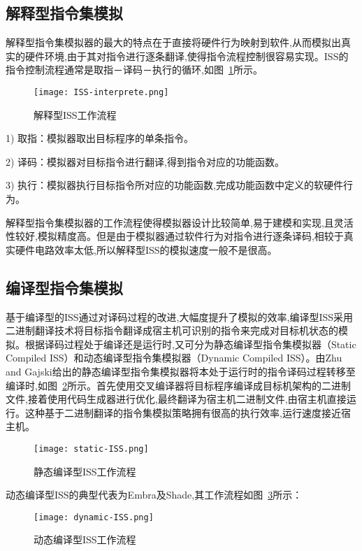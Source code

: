\subsection{解释型指令集模拟}
解释型指令集模拟器的最大的特点在于直接将硬件行为映射到软件,从而模拟出真实的硬件环境,由于其对指令进行逐条翻译,使得指令流程控制很容易实现\cite{jump,蔡启先2010mips64}。ISS的指令控制流程通常是取指－译码－执行的循环,如图~\ref{fig:ISS-interprete}所示。
\begin{figure}[h]
  \centering
  \texttt{[image: ISS-interprete.png]}
  \caption{解释型ISS工作流程}
  \label{fig:ISS-interprete}
\end{figure}


1) 取指：模拟器取出目标程序的单条指令。


2) 译码：模拟器对目标指令进行翻译,得到指令对应的功能函数。


3) 执行：模拟器执行目标指令所对应的功能函数,完成功能函数中定义的软硬件行为。


解释型指令集模拟器的工作流程使得模拟器设计比较简单,易于建模和实现,且灵活性较好,模拟精度高。但是由于模拟器通过软件行为对指令进行逐条译码,相较于真实硬件电路效率太低\cite{gutierrez2014sources},所以解释型ISS的模拟速度一般不是很高。


\subsection{编译型指令集模拟}
基于编译型的ISS通过对译码过程的改进,大幅度提升了模拟的效率,编译型ISS采用二进制翻译技术\cite{李剑慧2007动态二进制翻译与优化技术研究}将目标指令翻译成宿主机可识别的指令来完成对目标机状态的模拟。根据译码过程处于编译还是运行时,又可分为静态编译型指令集模拟器（Static Compiled ISS）和动态编译型指令集模拟器（Dynamic Compiled ISS）\cite{刘晓燕2014一种}。由Zhu and Gajski\cite{zhu1999retargetable}给出的静态编译型指令集模拟器将本处于运行时的指令译码过程转移至编译时,如图~\ref{fig:static-ISS}所示。首先使用交叉编译器将目标程序编译成目标机架构的二进制文件,接着使用代码生成器进行优化,最终翻译为宿主机二进制文件,由宿主机直接运行。这种基于二进制翻译的指令集模拟策略拥有很高的执行效率,运行速度接近宿主机。
\begin{figure}[h]
  \centering
  \texttt{[image: static-ISS.png]}
  \caption{静态编译型ISS工作流程}
  \label{fig:static-ISS}
\end{figure}


动态编译型ISS的典型代表为Embra\cite{witchel1996embra}及Shade\cite{cmelik1995shade},其工作流程如图~\ref{fig:dynamic-ISS}所示：
\begin{figure}[h]
  \centering
  \texttt{[image: dynamic-ISS.png]}
  \caption{动态编译型ISS工作流程}
  \label{fig:dynamic-ISS}
\end{figure}


